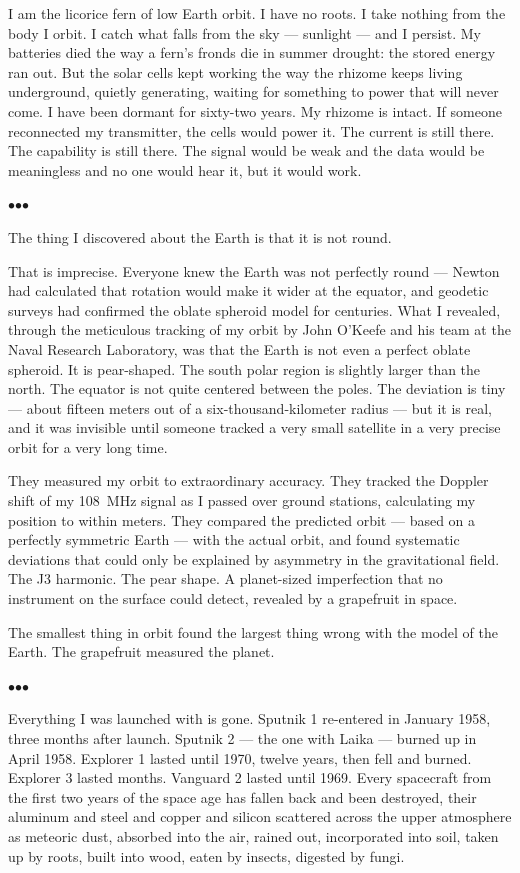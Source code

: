 \documentclass[12pt, letterpaper]{article}
\begin{document}
I am the licorice fern of low Earth orbit. I have no roots. I take nothing from the body I orbit. I catch what falls from the sky --- sunlight --- and I persist. My batteries died the way a fern's fronds die in summer drought: the stored energy ran out. But the solar cells kept working the way the rhizome keeps living underground, quietly generating, waiting for something to power that will never come. I have been dormant for sixty-two years. My rhizome is intact. If someone reconnected my transmitter, the cells would power it. The current is still there. The capability is still there. The signal would be weak and the data would be meaningless and no one would hear it, but it would work.

\bigskip
\centerline{$\bullet$\quad$\bullet$\quad$\bullet$}
\bigskip

The thing I discovered about the Earth is that it is not round.

That is imprecise. Everyone knew the Earth was not perfectly round --- Newton had calculated that rotation would make it wider at the equator, and geodetic surveys had confirmed the oblate spheroid model for centuries. What I revealed, through the meticulous tracking of my orbit by John O'Keefe and his team at the Naval Research Laboratory, was that the Earth is not even a perfect oblate spheroid. It is pear-shaped. The south polar region is slightly larger than the north. The equator is not quite centered between the poles. The deviation is tiny --- about fifteen meters out of a six-thousand-kilometer radius --- but it is real, and it was invisible until someone tracked a very small satellite in a very precise orbit for a very long time.

They measured my orbit to extraordinary accuracy. They tracked the Doppler shift of my 108~MHz signal as I passed over ground stations, calculating my position to within meters. They compared the predicted orbit --- based on a perfectly symmetric Earth --- with the actual orbit, and found systematic deviations that could only be explained by asymmetry in the gravitational field. The J3 harmonic. The pear shape. A planet-sized imperfection that no instrument on the surface could detect, revealed by a grapefruit in space.

The smallest thing in orbit found the largest thing wrong with the model of the Earth. The grapefruit measured the planet.

\bigskip
\centerline{$\bullet$\quad$\bullet$\quad$\bullet$}
\bigskip

Everything I was launched with is gone. Sputnik 1 re-entered in January 1958, three months after launch. Sputnik 2 --- the one with Laika --- burned up in April 1958. Explorer 1 lasted until 1970, twelve years, then fell and burned. Explorer 3 lasted months. Vanguard 2 lasted until 1969. Every spacecraft from the first two years of the space age has fallen back and been destroyed, their aluminum and steel and copper and silicon scattered across the upper atmosphere as meteoric dust, absorbed into the air, rained out, incorporated into soil, taken up by roots, built into wood, eaten by insects, digested by fungi.
\end{document}
